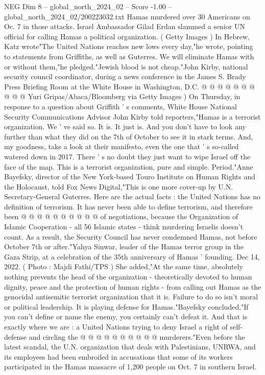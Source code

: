 \begin{textsample}{NEG Dim 8 – global\_north\_2024\_02 – Score -1.00 – global\_north\_2024\_02/200223032.txt}
Hamas murdered over 30 Americans on Oc. 7 in those attacks.
Israel Ambassador Gilad Erdan slammed a senior UN official for calling Hamas a political organization. ( Getty Images ) In Hebrew, Katz wrote"The United Nations reaches new lows every day,"he wrote, pointing to statements from Griffiths, as well as Guterres.
We will eliminate Hamas with or without them,"he pledged."Jewish blood is not cheap."John Kirby, national security council coordinator, during a news conference in the James S.
Brady Press Briefing Room at the White House in Washington, D.C. @ @ @ @ @ @ @ @ @ @ Yuri Gripas/Abaca/Bloomberg via Getty Images ) On Thursday, in response to a question about Griffith ' s comments, White House National Security Communications Advisor John Kirby told reporters,"Hamas is a terrorist organization.
We ' ve said so.
It is.
It just is.
And you don't have to look any further than what they did on the 7th of October to see it in stark terms.
And, my goodness, take a look at their manifesto, even the one that ' s so-called watered down in 2017.
There ' s no doubt they just want to wipe Israel off the face of the map.
This is a terrorist organization, pure and simple.
Period."Anne Bayefsky, director of the New York-based Touro Institute on Human Rights and the Holocaust, told Fox News Digital,"This is one more cover-up by U.N.
Secretary-General Guterres.
Here are the actual facts : the United Nations has no definition of terrorism.
It has never been able to define terrorism, and therefore been @ @ @ @ @ @ @ @ @ @ of negotiations, because the Organization of Islamic Cooperation - all 56 Islamic states - think murdering Israelis doesn't count.
As a result, the Security Council has never condemned Hamas, not before October 7th or after."Yahya Sinwar, leader of the Hamas terror group in the Gaza Strip, at a celebration of the 35th anniversary of Hamas ' founding.
Dec 14, 2022. ( Photo : Majdi Fathi/TPS ) She added,"At the same time, absolutely nothing prevents the head of the organization - theoretically devoted to human dignity, peace and the protection of human rights - from calling out Hamas as the genocidal antisemitic terrorist organization that it is.
Failure to do so isn't moral or political leadership.
It is playing defense for Hamas."Bayefsky concluded,"If you can't define or name the enemy, you certainly can't defeat it.
And that is exactly where we are : a United Nations trying to deny Israel a right of self-defense and circling the @ @ @ @ @ @ @ @ @ @ murderers."Even before the latest scandal, the U.N. organization that deals with Palestinians, UNRWA, and its employees had been embroiled in accusations that some of its workers participated in the Hamas massacre of 1,200 people on Oct. 7 in southern Israel.

\end{textsample}
